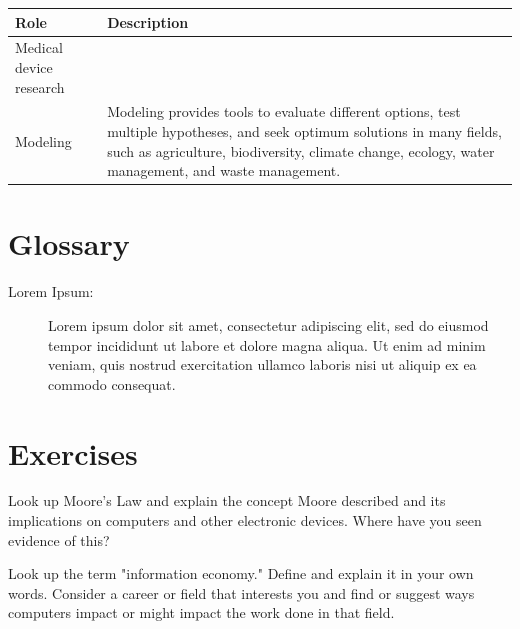 \begin{table}[H]
	\begin{center}
		\begin{tabular}{p{1.3in}|p{3in}} 
			\textbf{Role} & \textbf{Description}\\
			\hline
			Medical device research & \\
			\hline
			Modeling & Modeling provides tools to evaluate different options, test multiple hypotheses, and seek optimum solutions in many fields, such as agriculture, biodiversity, climate change, ecology, water management, and waste management.\\
			\hline
		\end{tabular}
	\end{center}
\end{table}

\section{Glossary}

\begin{description}
	
	\item[Lorem Ipsum:]  Lorem ipsum dolor sit amet, consectetur adipiscing elit, sed do eiusmod tempor incididunt ut labore et dolore magna aliqua. Ut enim ad minim veniam, quis nostrud exercitation ullamco laboris nisi ut aliquip ex ea commodo consequat.
	
\end{description}

\section{Exercises}

\begin{ex}
	Look up Moore's Law and explain the concept Moore described and its implications on computers and other electronic devices. Where have you seen evidence of this?	
\end{ex}

\begin{ex}
	Look up the term "information economy." Define and explain it in your own words. Consider a career or field that interests you and find or suggest ways computers impact or might impact the work done in that field.
\end{ex}

